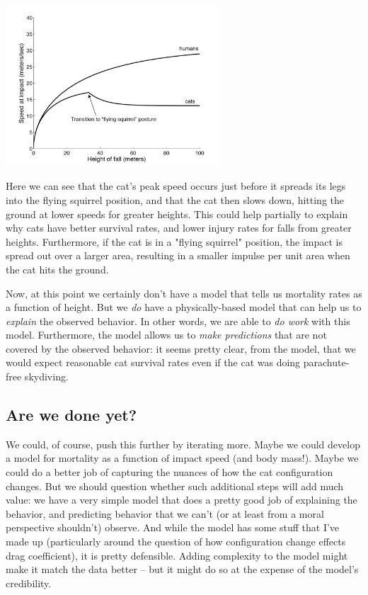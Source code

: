 \centerline{\includegraphics[height=6cm]{figs/CatSpeedWithPosture}}




Here we can see that the cat's peak speed occurs just before it spreads its legs into the flying squirrel position, and that the cat then slows down, hitting the ground at lower speeds for greater heights.  This could help partially to explain why cats have better survival rates, and lower injury rates for falls from greater heights.  Furthermore, if the cat is in a "flying squirrel" position, the impact is spread out over a larger area, resulting in a smaller impulse per unit area when the cat hits the ground.

Now, at this point we certainly don't have a model that tells us mortality rates as a function of height.  But we {\it do} have a physically-based model that can help us to {\it explain} the observed behavior.  In other words, we are able to {\it do work} with this model.  Furthermore, the model allows us to {\it make predictions} that are not covered by the observed behavior:  it seems pretty clear, from the model, that we would expect reasonable cat survival rates even if the cat was doing parachute-free skydiving.  

\subsection{Are we done yet?}

We could, of course, push this further by iterating more.  Maybe we could develop a model for mortality as a function of impact speed (and body mass!).  Maybe we could do a better job of capturing the nuances of how the cat configuration changes.  But we should question whether such additional steps will add much value:  we have a very simple model that does a pretty good job of explaining the behavior, and predicting behavior that we can't (or at least from a moral perspective shouldn't) observe.  And while the model has some stuff that I've made up (particularly around the question of how configuration change effects drag coefficient), it is pretty defensible.  Adding complexity to the model might make it match the data better -- but it might do so at the expense of the model's credibility.  

